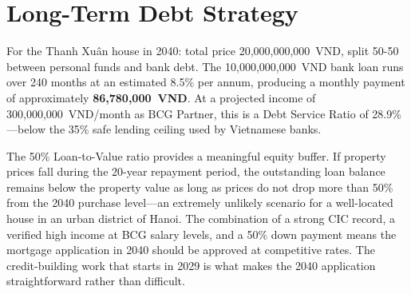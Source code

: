 \section{Long-Term Debt Strategy}

For the Thanh Xu\^{a}n house in 2040: total price 20,000,000,000~VND, split 50-50 between personal funds and bank debt. The 10,000,000,000~VND bank loan runs over 240 months at an estimated 8.5\% per annum, producing a monthly payment of approximately \textbf{86,780,000~VND}. At a projected income of 300,000,000~VND/month as BCG Partner, this is a Debt Service Ratio of 28.9\%---below the 35\% safe lending ceiling used by Vietnamese banks.

The 50\% Loan-to-Value ratio provides a meaningful equity buffer. If property prices fall during the 20-year repayment period, the outstanding loan balance remains below the property value as long as prices do not drop more than 50\% from the 2040 purchase level---an extremely unlikely scenario for a well-located house in an urban district of Hanoi. The combination of a strong CIC record, a verified high income at BCG salary levels, and a 50\% down payment means the mortgage application in 2040 should be approved at competitive rates. The credit-building work that starts in 2029 is what makes the 2040 application straightforward rather than difficult.
